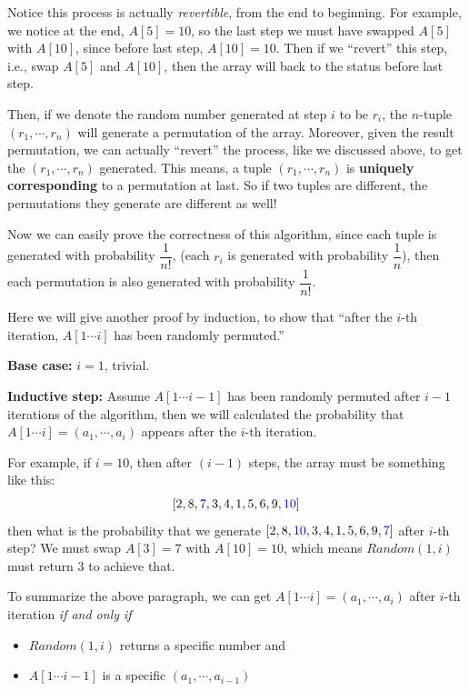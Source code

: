 \begin{spacing}{1.3}
    Notice this process is actually {\it revertible}, 
    from the end to beginning. For example, we notice at the end, 
    $A[5]=10$, so the last step we must have swapped $A[5]$ with 
    $A[10]$, since before last step, $A[10]=10$. Then if we 
    ``revert'' this step, i.e., swap $A[5]$ and $A[10]$, then 
    the array will back to the status before last step.

    Then, if we denote the random number generated at step $i$
    to be $r_i$, the $n$-tuple $(r_1,\cdots, r_n)$ will 
    generate a permutation of the array. Moreover, given the 
    result permutation, we can actually ``revert'' the process, 
    like we discussed above, to get the $(r_1,\cdots,r_n)$ 
    generated. This means, a tuple $(r_1,\cdots, r_n)$ is 
    {\bf uniquely corresponding} to a permutation at last.
    So if two tuples are different, the permutations they 
    generate are different as well!

    Now we can easily prove the correctness of this algorithm, 
    since each tuple is generated with probability $\dfrac{1}{n!}$,
    (each $r_i$ is generated with probability $\dfrac{1}{n}$),
    then each permutation is also generated with probability 
    $\dfrac{1}{n!}$.

    \vspace{0.3in}

    Here we will give another proof by induction, to show 
    that ``after the $i$-th iteration, $A[1\cdots i]$
    has been randomly permuted.''

    {\bf Base case: }$i=1$, trivial.

    {\bf Inductive step:} Assume $A[1\cdots i-1]$ has been randomly 
    permuted after $i-1$ iterations of the algorithm, then 
    we will calculated the probability that $A[1\cdots i]=
    (a_1,\cdots,a_i)$ appears after the $i$-th iteration.

    For example, if $i=10$, then after $(i-1)$ steps, 
    the array must be something like this: 
    $$[2,8,{\color{blue} 7},3,4,1,5,6,9,{\color{blue} 10}]$$
    then what is the probability that we generate 
    $[2,8,{\color{blue} 10},3,4,1,5,6,9,{\color{blue} 7}]$ after $i$-th step? 
    We must swap $A[3]=7$ with $A[10]=10$, which means 
    $Random(1, i)$ must return 3 to achieve that.

    To summarize the above paragraph, we can get 
    $A[1\cdots i]=(a_1,\cdots,a_i)$ after $i$-th iteration 
    {\it if and only if}
    \begin{itemize}
        \item $Random(1,i)$ returns a specific number and 
        \item $A[1\cdots i-1]$ is a specific $(a_1,\cdots,a_{i-1})$
    \end{itemize}


\end{spacing}
